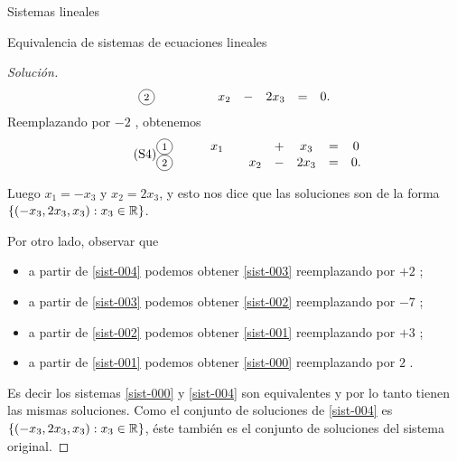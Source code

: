 \begin{chapter}{Sistemas lineales}
\begin{section}{Equivalencia de sistemas de ecuaciones lineales}
\begin{proof}[Solución]
\begin{align*}
\begin{matrix}
                    \text{\footnotesize\circled{2}}&\qquad && x_2 &-& 2x_3 &=& 0.
                \end{matrix}
                \end{align*} 
                Reemplazando  por  $-2$ , obtenemos
                \begin{align*}\label{sist-004} \tag{S4}
                \begin{matrix}
                    \text{\footnotesize\circled{1}}&\qquad x_1 && &+& x_3 &=& 0 \\
                    \text{\footnotesize\circled{2}}&\qquad && x_2 &-& 2x_3 &=& 0.
                \end{matrix}
                \end{align*} 
                
                Luego $x_1 = -x_3$ y $x_2 = 2x_3$, y esto nos dice que las soluciones son de la forma $\{(-x_3,2x_3, x_3): x_3 \in \mathbb R \}$.
                
                Por otro lado, observar que 
                \begin{itemize}
                    \item a partir de \eqref{sist-004} podemos obtener \eqref{sist-003} reemplazando {\footnotesize{}} por {\footnotesize{}} $+2$ {\footnotesize{}};
                    \item a partir de \eqref{sist-003} podemos obtener \eqref{sist-002} reemplazando {\footnotesize{}} por $-7$ {\footnotesize{}};
                    \item a partir de \eqref{sist-002} podemos obtener \eqref{sist-001} reemplazando {\footnotesize{}} por {\footnotesize{}} $+3$ {\footnotesize{}};
                    \item a partir de \eqref{sist-001} podemos obtener \eqref{sist-000} reemplazando  {\footnotesize{}} por $2$  {\footnotesize{}}.
                \end{itemize}
                
                Es decir los sistemas  \eqref{sist-000} y 
                \eqref{sist-004} son equivalentes y por lo tanto  tienen las mismas soluciones.  Como el conjunto de soluciones de 
                \eqref{sist-004} es $\{(-x_3,2x_3, x_3): x_3 \in \mathbb R \}$,  éste también es el conjunto de soluciones del sistema original. 
            \end{proof}
            

\end{section}
\end{chapter}
